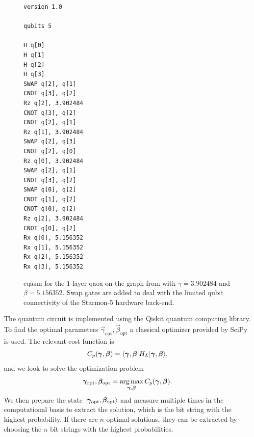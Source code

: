 \begin{figure}[H]
    \begin{verbatim}
version 1.0

qubits 5

H q[0]
H q[1]
H q[2]
H q[3]
SWAP q[2], q[1]
CNOT q[3], q[2]
Rz q[2], 3.902484
CNOT q[3], q[2]
CNOT q[2], q[1]
Rz q[1], 3.902484
SWAP q[2], q[3]
CNOT q[2], q[0]
Rz q[0], 3.902484
SWAP q[2], q[1]
CNOT q[3], q[2]
SWAP q[0], q[2]
CNOT q[1], q[2]
CNOT q[0], q[2]
Rz q[2], 3.902484
CNOT q[0], q[2]
Rx q[0], 5.156352
Rx q[1], 5.156352
Rx q[2], 5.156352
Rx q[3], 5.156352
    \end{verbatim}
    \caption[\acrshort{cqasm} for the $p$-layer \gls{qaoa} on the graph from .]{
        \acrshort{cqasm} for the $1$-layer \gls{qaoa} on the graph from  with $\gamma = 3.902484$ and $\beta = 5.156352$.
        Swap gates are added to deal with the limited qubit connectivity of the Starmon-5 hardware back-end.
    }
    \label{fig:qaoa-cqasm}
\end{figure}


The quantum circuit is implemented using the Qiskit quantum computing library.
To find the optimal parameters $\vec{\gamma}_\text{opt}, \vec{\beta}_\text{opt}$ a classical optimizer provided by SciPy is used.
The relevant cost function is
\begin{equation}
C_p(\bm{\gamma}, \bm{\beta}) = \langle{\bm{\gamma}, \bm{\beta}}\vert H_L\vert{\bm{\gamma}, \bm{\beta}}\rangle,
\end{equation}
and we look to solve the optimization problem
\begin{equation}
\bm{\gamma}_\text{opt}, \bm{\beta}_\text{opt} = \operatorname*{arg\,max}_{\bm{\gamma}, \bm{\beta}} C_p(\bm{\gamma}, \bm{\beta}).
\end{equation}
We then prepare the state $\vert{\bm{\gamma}_\text{opt}, \bm{\beta}_\text{opt}}\rangle$ and measure multiple times in the computational basis to extract the solution, which is the bit string with the highest probability.
If there are $n$ optimal solutions, they can be extracted by choosing the $n$ bit strings with the highest probabilities. 


